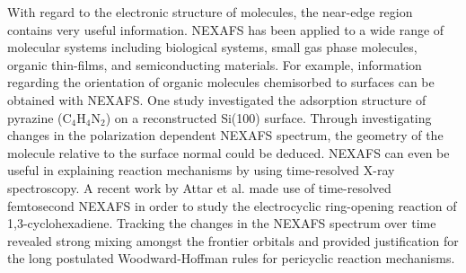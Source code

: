 \documentclass{article}
\begin{document}
With regard to the electronic structure of molecules, the near-edge region contains very useful information. \cite{garino_determination_2014,tourillon_electronic_1988} NEXAFS has been applied to a wide range of molecular systems including biological systems,\cite{zubavichus_nexafs_2004, zubavichus_nexafs_2009,samuel_nexafs_2017} small gas phase molecules,\cite{contini_gas-phase_2001,domke_carbon_1990,hudson_high-resolution_1994} organic thin-films,\cite{roy_structure_2005,hahner_near_2006,baldo_excitonic_1999} and semiconducting materials.\cite{guo_electronic_2011} For example, information regarding the orientation of organic molecules chemisorbed to surfaces can be obtained with NEXAFS. \cite{hoffmann_discovery_1990,stohr_bonding_1983,temprano_1d_2015,rastgoo-lahrood_post-synthetic_2016} One study investigated the adsorption structure of pyrazine (C$_4$H$_4$N$_2$) on a reconstructed Si(100) surface. \cite{lee_selective_2012} Through investigating changes in the polarization dependent NEXAFS spectrum, the geometry of the molecule relative to the surface normal could be deduced. NEXAFS can even be useful in explaining reaction mechanisms by using time-resolved X-ray spectroscopy.\cite{chen_probing_2005} A recent work by Attar et al. made use of time-resolved femtosecond NEXAFS in order to study the electrocyclic ring-opening reaction of 1,3-cyclohexadiene. \cite{attar_femtosecond_2017} Tracking the changes in the NEXAFS spectrum over time revealed strong mixing amongst the frontier orbitals and provided justification for the long postulated Woodward-Hoffman rules for pericyclic reaction mechanisms. \cite{day_aromaticity_1975}
\end{document}
